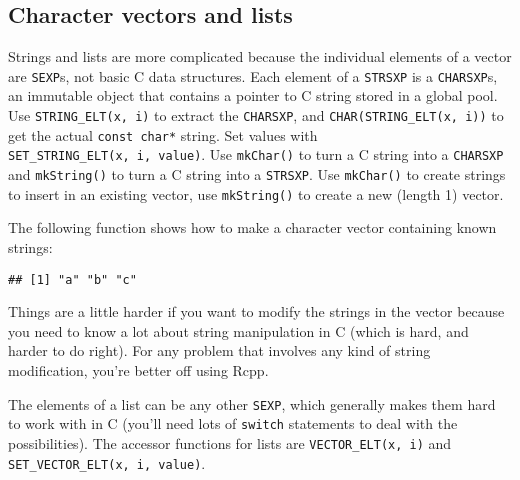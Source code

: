 \hypertarget{character-vectors-and-lists}{%
\subsection{Character vectors and
lists}\label{character-vectors-and-lists}}

Strings and lists are more complicated because the individual elements
of a vector are \texttt{SEXP}s, not basic C data structures. Each
element of a \texttt{STRSXP} is a \texttt{CHARSXP}s, an immutable object
that contains a pointer to C string stored in a global pool. Use
\texttt{STRING\_ELT(x,\ i)} to extract the \texttt{CHARSXP}, and
\texttt{CHAR(STRING\_ELT(x,\ i))} to get the actual
\texttt{const\ char*} string. Set values with
\texttt{SET\_STRING\_ELT(x,\ i,\ value)}. Use \texttt{mkChar()} to turn
a C string into a \texttt{CHARSXP} and \texttt{mkString()} to turn a C
string into a \texttt{STRSXP}. Use \texttt{mkChar()} to create strings
to insert in an existing vector, use \texttt{mkString()} to create a new
(length 1) vector.

The following function shows how to make a character vector containing
known strings:

\begin{Shaded}
\begin{Highlighting}[]
\StringTok{ }\NormalTok{(}\NormalTok{, }



\NormalTok{)}
\NormalTok{()}
\end{Highlighting}
\end{Shaded}

\begin{verbatim}
## [1] "a" "b" "c"
\end{verbatim}

Things are a little harder if you want to modify the strings in the
vector because you need to know a lot about string manipulation in C
(which is hard, and harder to do right). For any problem that involves
any kind of string modification, you're better off using Rcpp.

The elements of a list can be any other \texttt{SEXP}, which generally
makes them hard to work with in C (you'll need lots of \texttt{switch}
statements to deal with the possibilities). The accessor functions for
lists are \texttt{VECTOR\_ELT(x,\ i)} and
\texttt{SET\_VECTOR\_ELT(x,\ i,\ value)}.

